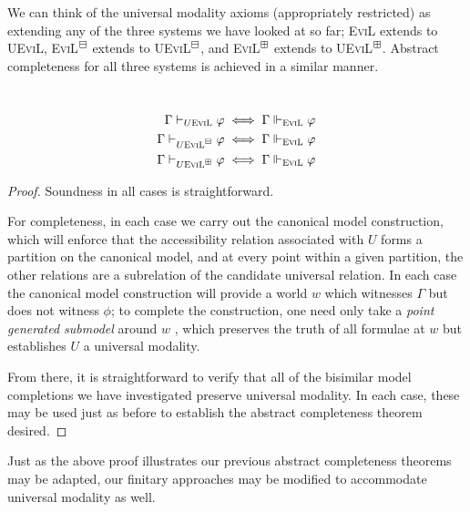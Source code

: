 We can think of the universal modality axioms (appropriately
restricted) as extending any of the
three systems we have looked at so far; \textsc{EviL} extends to
U\textsc{EviL},
\textsc{EviL}$^\boxminus$ extends to U\textsc{EviL}$^\boxminus$, and
\textsc{EviL}$^\boxplus$ extends to U\textsc{EviL}$^\boxplus$.  Abstract completeness
for all three systems is achieved in a similar manner.

\begin{theorem}\ \\
\begin{align*}
\Gamma \vdash_{U\textup{\textsc{EviL}}} \varphi & \iff \Gamma\Vdash_{\textup{\textsc{EviL}}}
\varphi \\
\Gamma \vdash_{U\textup{\textsc{EviL}$^\boxminus$}} \varphi & \iff \Gamma\Vdash_{\textup{\textsc{EviL}}}
\varphi \\
\Gamma \vdash_{U\textup{\textsc{EviL}}^\boxplus} \varphi & \iff \Gamma\Vdash_{\textup{\textsc{EviL}}}
\varphi 
\end{align*}
\end{theorem}
\begin{proof}
Soundness in all cases is straightforward.

For completeness, in each case we carry out the canonical model
construction, 
which will enforce that the accessibility relation associated with $U$ forms
a partition on the canonical model, and at every point within a
given partition, the other relations are a subrelation of the
candidate universal relation.  In each case the canonical model construction will
provide a world $w$ which witnesses $\Gamma$ but does not witness
$\phi$; to complete the construction, one need only take a \emph{point
  generated submodel} around $w$ \cite[chapter 2]{blackburn_modal_2001}, which preserves the truth of all
formulae at $w$ but establishes $U$ a universal modality.

From there, it is straightforward to verify that all of the bisimilar
model completions we have investigated preserve universal modality.
In each case, these may be used just as before to establish the
abstract completeness theorem desired.
\end{proof}

Just as the above proof illustrates our previous abstract completeness
theorems may be adapted, our finitary approaches may be modified to
accommodate universal modality as well.

